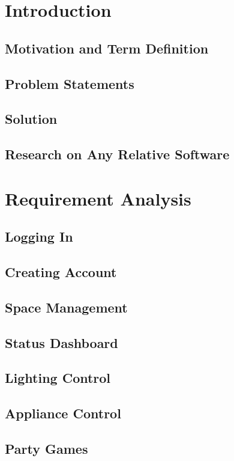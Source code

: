 \documentclass[conference]{IEEEtran}
\begin{document}
\section{Introduction}

\subsection{Motivation and Term Definition}
\subsection{Problem Statements}
\subsection{Solution}
\subsection{Research on Any Relative Software}

\section{Requirement Analysis}

\subsection{Logging In}
\subsection{Creating Account}
\subsection{Space Management}
\subsection{Status Dashboard}
\subsection{Lighting Control}
\subsection{Appliance Control}
\subsection{Party Games}
\end{document}
